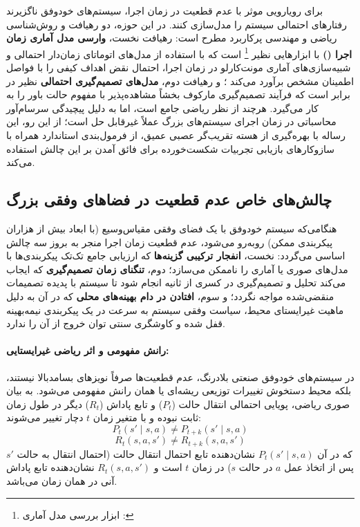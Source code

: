 \documentclass[oneside,openany,phd]{TMU-Thesis}
\begin{document}
برای رویارویی موثر با عدم قطعیت در زمان اجرا، سیستم‌های خودوفق ناگزیرند رفتارهای احتمالی سیستم را مدل‌سازی کنند. در این حوزه، دو رهیافت و روش‌شناسی ریاضی و مهندسی پرکاربرد مطرح است: رهیافت نخست، \textbf{وارسی مدل آماری زمان اجرا ()} با ابزارهایی نظیر \footnote{ابزار بررسی مدل آماری : } است که با استفاده از مدل‌های اتوماتای زمان‌دار احتمالی و شبیه‌سازی‌های آماری مونت‌کارلو در زمان اجرا، احتمال نقض اهداف کیفی را با فواصل اطمینان مشخص برآورد می‌کند \cite{david2015uppaal}؛ و رهیافت دوم، \textbf{مدل‌های تصمیم‌گیری احتمالی} نظیر  در برابر  است که فرآیند تصمیم‌گیری مارکوف بخشاً مشاهده‌پذیر با مفهوم حالت باور را به کار می‌گیرد. هرچند  از نظر ریاضی جامع است، اما به دلیل پیچیدگی سرسام‌آور محاسباتی در زمان اجرای سیستم‌های بزرگ عملاً غیرقابل حل است؛ از این رو، این رساله با بهره‌گیری از هسته تقریب‌گر عصبی عمیق، از فرمول‌بندی  استاندارد همراه با سازوکارهای بازیابی تجربیات شکست‌خورده برای فائق آمدن بر این چالش استفاده می‌کند.

\subsection{چالش‌های خاص عدم قطعیت در فضاهای وفقی بزرگ}

هنگامی‌که سیستم خودوفق با یک فضای وفقی مقیاس‌وسیع (با ابعاد بیش از هزاران پیکربندی ممکن) روبه‌رو می‌شود، عدم قطعیت زمان اجرا منجر به بروز سه چالش اساسی می‌گردد: نخست، \textbf{انفجار ترکیبی گزینه‌ها} که ارزیابی جامع تک‌تک پیکربندی‌ها با مدل‌های صوری یا آماری را ناممکن می‌سازد؛ دوم، \textbf{تنگنای زمان تصمیم‌گیری} که ایجاب می‌کند تحلیل و تصمیم‌گیری در کسری از ثانیه انجام شود تا سیستم با پدیده تصمیمات منقضی‌شده مواجه نگردد؛ و سوم، \textbf{افتادن در دام بهینه‌های محلی} که در آن به دلیل ماهیت غیرایستای محیط، سیاست وفقی سیستم به سرعت در یک پیکربندی نیمه‌بهینه قفل شده و کاوشگری سنتی توان خروج از آن را ندارد.

\paragraph{رانش مفهومی و اثر ریاضی غیرایستایی:}
در سیستم‌های خودوفق صنعتی بلادرنگ، عدم قطعیت‌ها صرفاً نویزهای بسامدبالا نیستند، بلکه محیط دستخوش تغییرات توزیعی ریشه‌ای یا همان رانش مفهومی می‌شود. به بیان صوری ریاضی، پویایی احتمالی انتقال حالت ($P_t$) و تابع پاداش ($R_t$) دیگر در طول زمان ثابت نبوده و با متغیر زمان $t$ دچار تغییر می‌شوند:
$$P_t(s' \mid s, a) \neq P_{t+k}(s' \mid s, a)$$
$$R_t(s, a, s') \neq R_{t+k}(s, a, s')$$
که در آن $P_t(s' \mid s, a)$ نشان‌دهنده تابع احتمال انتقال حالت (احتمال انتقال به حالت $s'$ پس از اتخاذ عمل $a$ در حالت $s$) در زمان $t$ است و $R_t(s, a, s')$ نشان‌دهنده تابع پاداش آنی در همان زمان می‌باشد.
\end{document}
